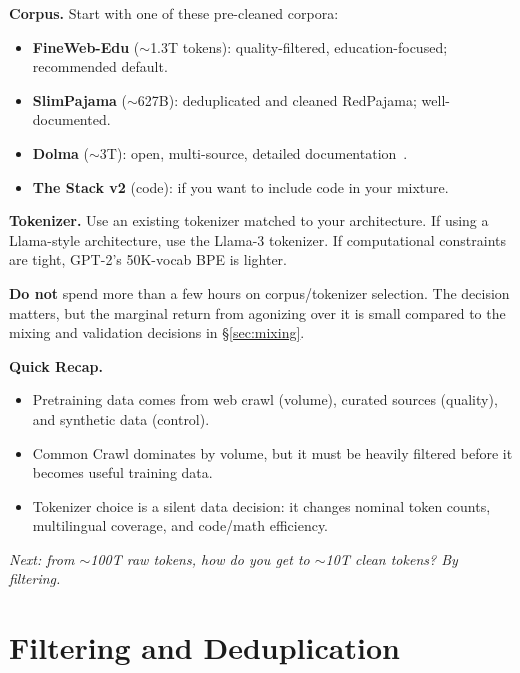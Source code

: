 \begin{tcolorbox}[colback=orange!5, colframe=orange!60, title=\textbf{For Project~2: Corpus and Tokenizer Choice}]
\textbf{Corpus.} Start with one of these pre-cleaned corpora:
\begin{itemize}[nosep]
  \item \textbf{FineWeb-Edu} ($\sim$1.3T tokens): quality-filtered, education-focused; recommended default.
  \item \textbf{SlimPajama} ($\sim$627B): deduplicated and cleaned RedPajama; well-documented.
  \item \textbf{Dolma} ($\sim$3T): open, multi-source, detailed documentation~\cite{soldaini2024dolma}.
  \item \textbf{The Stack v2} (code): if you want to include code in your mixture.
\end{itemize}

\textbf{Tokenizer.} Use an existing tokenizer matched to your architecture. If using a Llama-style architecture, use the Llama-3 tokenizer. If computational constraints are tight, GPT-2's 50K-vocab BPE is lighter.

\textbf{Do not} spend more than a few hours on corpus/tokenizer selection. The decision matters, but the marginal return from agonizing over it is small compared to the mixing and validation decisions in \S\ref{sec:mixing}.
\end{tcolorbox}

\begin{quickrecap}
\textbf{Quick Recap.}
\begin{itemize}[nosep,leftmargin=1.5em]
  \item Pretraining data comes from web crawl (volume), curated sources (quality), and synthetic data (control).
  \item Common Crawl dominates by volume, but it must be heavily filtered before it becomes useful training data.
  \item Tokenizer choice is a silent data decision: it changes nominal token counts, multilingual coverage, and code/math efficiency.
\end{itemize}
\textit{Next: from $\sim$100T raw tokens, how do you get to $\sim$10T clean tokens? By filtering.}
\end{quickrecap}


\section{Filtering and Deduplication}
\label{sec:filter-dedup}

